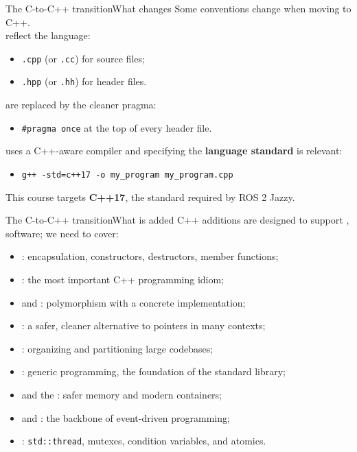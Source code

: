 \begin{frame}{The C-to-C++ transition}{What changes}
	\justifying
	Some conventions change when moving to C++.\\
	\bigskip
	 reflect the language:
	\begin{itemize}
		\item \texttt{.cpp} (or \texttt{.cc}) for source files;
		\item \texttt{.hpp} (or \texttt{.hh}) for header files.
	\end{itemize}
	\bigskip
	 are replaced by the cleaner pragma:
	\begin{itemize}
		\item \texttt{\#pragma once} at the top of every header file.
	\end{itemize}
	\bigskip
	 uses a C++-aware compiler and specifying the \textbf{language standard} is relevant:
	\begin{itemize}
		\item \texttt{g++ -std=c++17 -o my\_program my\_program.cpp}
	\end{itemize}
	\begin{block}{}
		\centering
		This course targets \textbf{C++17}, the standard required by ROS 2 Jazzy.
	\end{block}
\end{frame}
\begin{frame}{The C-to-C++ transition}{What is added}
	\justifying
	C++ additions are designed to support ,  software; we need to cover:
	\begin{itemize}
		\item {}: encapsulation, constructors, destructors, member functions;
		\item {}: the most important C++ programming idiom;
		\item {} and : polymorphism with a concrete implementation;
		\item {}: a safer, cleaner alternative to pointers in many contexts;
		\item {}: organizing and partitioning large codebases;
		\item {}: generic programming, the foundation of the standard library;
		\item {} and the : safer memory and modern containers;
		\item {} and : the backbone of event-driven programming;
		\item {}: \texttt{std::thread}, mutexes, condition variables, and atomics.
	\end{itemize}
\end{frame}
